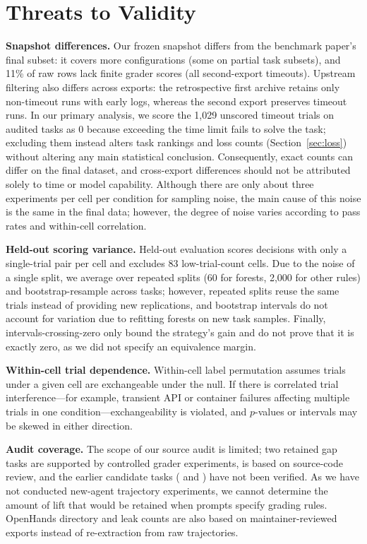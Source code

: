 \documentclass[10pt,conference]{IEEEtran}
\newif\ifkeepcuts \keepcutstrue
\newcommand{\cut}[1]{\ifkeepcuts #1\fi}
\begin{document}
\section{Threats to Validity}
\textbf{Snapshot differences.} Our frozen snapshot differs from the benchmark paper's final subset: it covers more configurations (some on partial task subsets), and 11\% of raw rows lack finite grader scores (all second-export timeouts). Upstream filtering also differs across exports: the retrospective first archive retains only non-timeout runs with early logs, whereas the second export preserves timeout runs. In our primary analysis, we score the 1,029 unscored timeout trials on audited tasks as 0 because exceeding the time limit fails to solve the task; excluding them instead alters task rankings and loss counts (Section~\ref{sec:loss}) without altering any main statistical conclusion. Consequently, exact counts can differ on the final dataset, and cross-export differences should not be attributed solely to time or model capability. Although there are only about three experiments per cell per condition for sampling noise, the main cause of this noise is the same in the final data; however, the degree of noise varies according to pass rates and within-cell correlation.

\textbf{Held-out scoring variance.} Held-out evaluation scores decisions with only a single-trial pair per cell and excludes 83 low-trial-count cells.\cut{ Due to the noise of a single split, we average over repeated splits (60 for forests, 2,000 for other rules) and bootstrap-resample across tasks; however, repeated splits reuse the same trials instead of providing new replications, and bootstrap intervals do not account for variation due to refitting forests on new task samples.} Finally, intervals-crossing-zero only bound the strategy's gain and do not prove that it is exactly zero, as we did not specify an equivalence margin.

\textbf{Within-cell trial dependence.} Within-cell label permutation assumes trials under a given cell are exchangeable under the null. If there is correlated trial interference---for example, transient API or container failures affecting multiple trials in one condition---exchangeability is violated, and $p$-values or intervals may be skewed in either direction.

\textbf{Audit coverage.} The scope of our source audit is limited; two retained gap tasks are supported by controlled grader experiments,  is based on source-code review, and the earlier candidate tasks ( and ) have not been verified.\cut{ As we have not conducted new-agent trajectory experiments, we cannot determine the amount of lift that would be retained when prompts specify grading rules.}\cut{ OpenHands directory and leak counts are also based on maintainer-reviewed exports instead of re-extraction from raw trajectories.}
\end{document}
